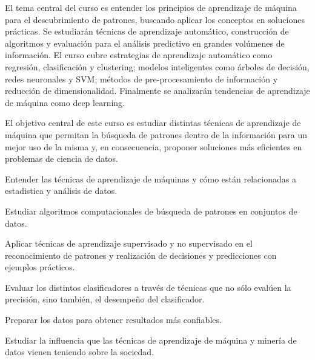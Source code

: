 \begin{syllabus}


\begin{justification}

El tema central del curso es entender los principios de aprendizaje de máquina para el descubrimiento de patrones, buscando aplicar los conceptos en soluciones prácticas. Se estudiarán técnicas de aprendizaje automático, construcción de algoritmos y evaluación para el análisis predictivo en grandes volúmenes de información. El curso cubre estrategias de aprendizaje automático como regresión, clasificación y clustering; modelos inteligentes como árboles de decisión, redes neuronales y SVM; métodos de pre-procesamiento de información y reducción de dimensionalidad. Finalmente se analizarán tendencias de aprendizaje de máquina como deep learning.
\end{justification}

\begin{goals}
\item El objetivo central de este curso es estudiar distintas técnicas de aprendizaje de máquina que permitan la búsqueda de patrones 
      dentro de la información para un mejor uso de la misma y, en consecuencia, proponer soluciones más eficientes en problemas de ciencia de datos.
\item Entender las técnicas de aprendizaje de máquinas y cómo están relacionadas a estadistica  y análisis de datos.
\item Estudiar algoritmos computacionales de búsqueda de patrones en conjuntos de datos.
\item Aplicar técnicas de aprendizaje supervisado y no supervisado en el reconocimiento de patrones y realización de decisiones y predicciones con ejemplos prácticos.
\item Evaluar los distintos clasificadores a través de técnicas que no sólo evalúen la precisión, sino también, el desempeño del clasificador.
\item Preparar los datos para obtener resultados más confiables.
\item Estudiar la influencia que las técnicas de aprendizaje de máquina y minería de datos vienen teniendo sobre la sociedad.
\end{goals}

\begin{outcomes}
\item {}
\item {}
\end{outcomes}


\end{syllabus}
